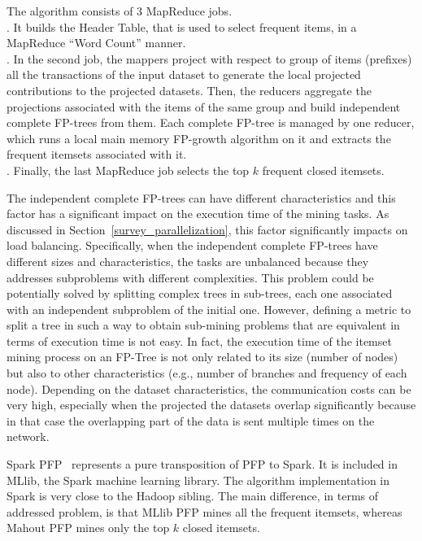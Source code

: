 The algorithm consists of 3 MapReduce jobs.\\ 
. It builds the Header Table, that is used to select frequent items, in a MapReduce ``Word Count'' manner. \\
. In the second job, the mappers project with respect to group of items (prefixes) all the transactions of the input dataset to generate the local projected contributions to the projected datasets. Then, the reducers aggregate the projections associated with the items of the same group and build independent complete FP-trees from them. Each complete FP-tree is managed by one reducer, which runs a local main memory FP-growth algorithm on it and extracts the frequent itemsets associated with it.  \\
. Finally, the last MapReduce job selects the top $k$ frequent closed itemsets.

The independent complete FP-trees can have different characteristics and this factor has
a significant impact on the execution time of the mining tasks. As discussed in Section~\ref{survey_parallelization},
this factor significantly impacts on load balancing. Specifically,   
when the independent complete FP-trees have different sizes and characteristics, the tasks are unbalanced because they addresses
subproblems with different complexities. This problem could be potentially solved by
splitting complex trees in sub-trees, each one associated with an independent subproblem of the initial one.
However, defining a metric to split a tree
in such a way to obtain sub-mining problems that are equivalent in terms of execution time is not easy. In fact, the execution 
time of the itemset mining process on an FP-Tree is not only related to its size (number of nodes) but also to other characteristics (e.g., number of branches
and frequency of each node). 
Depending on the dataset characteristics, the communication costs can be very high, especially when the projected the datasets overlap significantly
because in that case the overlapping part of the data is sent multiple times on the network.

Spark PFP~\cite{MLLib} represents a pure transposition of PFP to Spark. It
is included in MLlib, the Spark machine learning library. The algorithm
implementation in Spark is very close to the Hadoop sibling. The main difference, in terms of addressed problem, is that 
MLlib PFP mines all the frequent itemsets, whereas Mahout PFP mines only the top $k$ closed itemsets. 

